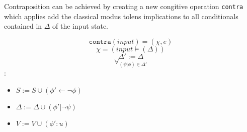 Contraposition can be achieved by creating a new congitive operation \texttt{contra} which applies add the classical modus tolens implications to all conditionals contained in $\Delta$ of the input state.

\[\texttt{contra}(\textit{input})=(\chi,e)\]
\[\chi=(\textit{input}\models (\Delta))\]
\[\Delta' := \Delta\]
\[\forall_{(\psi|\phi) \in \Delta'}\]:
\begin{itemize}
\item $S:=S \cup (\phi'\leftarrow \lnot \phi)$
\item $\Delta := \Delta\cup (\phi'| \lnot \psi)$
\item $V:=V\cup(\phi':u)$
\end{itemize}



















